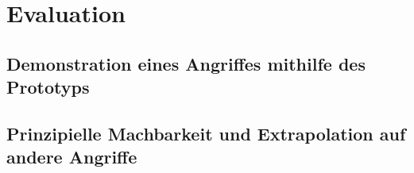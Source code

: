 \chapter{Evaluation}
\label{chapter:evaluation}

\section{Demonstration eines Angriffes mithilfe des Prototyps}
\section{Prinzipielle Machbarkeit und Extrapolation auf andere Angriffe}
